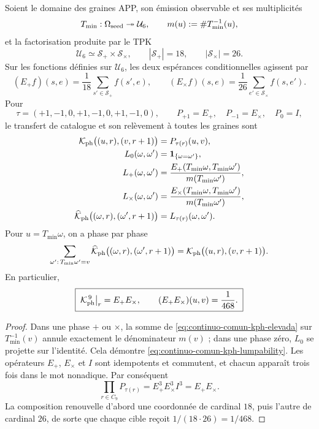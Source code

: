 \begin{proposition}
\label{prop:continuo-comun-kph-heredada}
\label{pII-full:thm:seleccion-novena-fase}
Soient le domaine des graines APP, son émission observable et ses multiplicités
\[
 T_{\min}:\Omega_{\rm seed}\twoheadrightarrow\mathcal U_6,
 \qquad
 m(u):=\#T_{\min}^{-1}(u),
\]
et la factorisation produite par le TPK
\[
 \mathcal U_6\simeq\mathcal S_+\times\mathcal S_\times,
 \qquad |\mathcal S_+|=18,\qquad |\mathcal S_\times|=26.
\]
Sur les fonctions définies sur \(\mathcal U_6\), les deux espérances conditionnelles agissent par
\[
 (E_+f)(s,e)=\frac1{18}\sum_{s'\in\mathcal S_+}f(s',e),
 \qquad
 (E_\times f)(s,e)=\frac1{26}
 \sum_{e'\in\mathcal S_\times}f(s,e').
\]
Pour
\[
 \tau=(+1,-1,0,+1,-1,0,+1,-1,0),
 \qquad
 P_{+1}=E_+,\quad P_{-1}=E_\times,\quad P_0=I,
\]
le transfert de catalogue et son relèvement à toutes les graines sont
\begin{align}
 \mathcal K_{\rm ph}\bigl((u,r),(v,r+1)\bigr)
 &=P_{\tau(r)}(u,v),
 \label{eq:continuo-comun-kph-catalogo}\\
 L_0(\omega,\omega')&=\mathbf1_{\{\omega=\omega'\}},\nonumber\\
 L_+(\omega,\omega')
 &=\frac{E_+(T_{\min}\omega,T_{\min}\omega')}
         {m(T_{\min}\omega')},\nonumber\\
 L_\times(\omega,\omega')
 &=\frac{E_\times(T_{\min}\omega,T_{\min}\omega')}
         {m(T_{\min}\omega')},\nonumber\\
 \widehat{\mathcal K}_{\rm ph}
 \bigl((\omega,r),(\omega',r+1)\bigr)
 &=L_{\tau(r)}(\omega,\omega').
 \label{eq:continuo-comun-kph-elevada}
\end{align}
Pour \(u=T_{\min}\omega\), on a phase par phase
\begin{equation}
\label{eq:continuo-comun-kph-lumpability}
 \sum_{\omega':\,T_{\min}\omega'=v}
 \widehat{\mathcal K}_{\rm ph}
 \bigl((\omega,r),(\omega',r+1)\bigr)
 =
 \mathcal K_{\rm ph}\bigl((u,r),(v,r+1)\bigr).
\end{equation}
En particulier,
\begin{equation}
\label{eq:continuo-comun-kph-novena-potencia}
 \boxed{\;
 \mathcal K_{\rm ph}^{\,9}\big|_r=E_+E_\times,
 \qquad
 (E_+E_\times)(u,v)=\frac1{468}.
 \;}
\end{equation}
\end{proposition}

\begin{proof}
Dans une phase \(+\) ou \(\times\), la somme de \eqref{eq:continuo-comun-kph-elevada} sur \(T_{\min}^{-1}(v)\) annule exactement le dénominateur \(m(v)\) ; dans une phase zéro, \(L_0\) se projette sur l'identité. Cela démontre \eqref{eq:continuo-comun-kph-lumpability}. Les opérateurs \(E_+\), \(E_\times\) et \(I\) sont idempotents et commutent, et chacun apparaît trois fois dans le mot nonadique. Par conséquent
\[
 \prod_{r\in C_9}P_{\tau(r)}
 =E_+^3E_\times^3I^3=E_+E_\times.
\]
La composition renouvelle d'abord une coordonnée de cardinal \(18\), puis l'autre de cardinal \(26\), de sorte que chaque cible reçoit \(1/(18\cdot26)=1/468\).
\end{proof}

